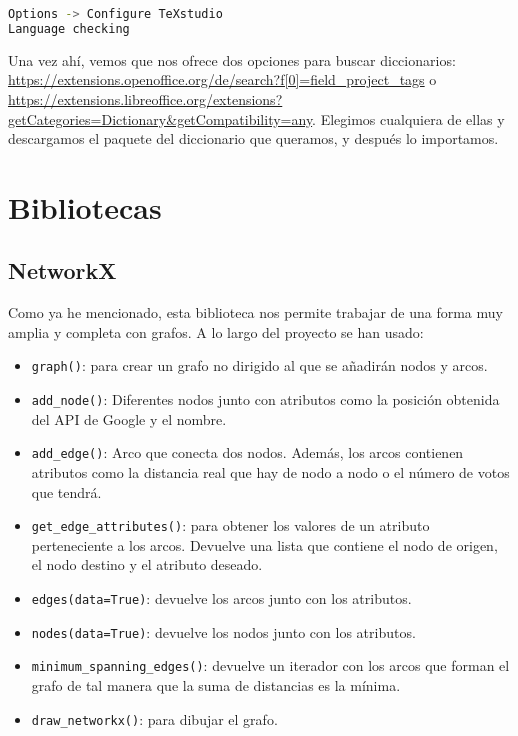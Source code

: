 \renewcommand{\lstlistingname}{Configure \TeX studio}%
\renewcommand{\lstlistlistingname}{List of \lstlistingname s}
\begin{lstlisting}[language=bash,caption={Añadir diccionario}]
Options -> Configure TeXstudio
Language checking
\end{lstlisting}

Una vez ahí, vemos que nos ofrece dos opciones para buscar diccionarios: \url{https://extensions.openoffice.org/de/search?f[0]=field_project_tags} o \url{https://extensions.libreoffice.org/extensions?getCategories=Dictionary&getCompatibility=any}. Elegimos cualquiera de ellas y descargamos el paquete del diccionario que queramos, y después lo importamos.


\section{Bibliotecas}

\subsection{NetworkX}
Como ya he mencionado, esta biblioteca nos permite trabajar de una forma muy amplia y completa con grafos. A lo largo del proyecto se han usado:
\begin{itemize}
	\item \texttt{graph()}: para crear un grafo no dirigido al que se añadirán nodos y arcos.
	\item \texttt{add\_node()}: Diferentes nodos junto con atributos como la posición obtenida del API de Google y el nombre.
	\item \texttt{add\_edge()}: Arco que conecta dos nodos. Además, los arcos contienen atributos como la distancia real que hay de nodo a nodo o el número de votos que tendrá.
	\item \texttt{get\_edge\_attributes()}: para obtener los valores de un atributo perteneciente a los arcos. Devuelve una lista que contiene el nodo de origen, el nodo destino y el atributo deseado.
	\item \texttt{edges(data=True)}: devuelve los arcos junto con los atributos.
	\item \texttt{nodes(data=True)}: devuelve los nodos junto con los atributos.
	\item \texttt{minimum\_spanning\_edges()}: devuelve un iterador con los arcos que forman el grafo de tal manera que la suma de distancias es la mínima.
	\item \texttt{draw\_networkx()}: para dibujar el grafo.
\end{itemize}

